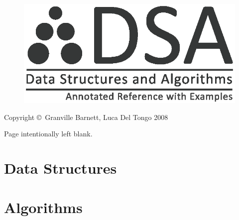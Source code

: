 \documentclass[10pt,oneside,a4paper]{report}
\begin{document}
\begin{figure}
\begin{center}
\includegraphics{dsa_logo}
\end{center}
\end{figure}
\title{}
\author{Granville Barnett\\Luca Del Tongo}
\maketitle

\pagestyle{empty}

\newpage
\begin{center}
Copyright \copyright~Granville Barnett, Luca Del Tongo 2008
\end{center}
\newpage

\pagestyle{plain}

\newpage
\tableofcontents
\newpage

\pagestyle{headings}



\pagestyle{empty}

\newpage
\begin{center}
Page intentionally left blank.
\end{center}
\newpage

\pagestyle{headings}


\part{Data Structures}







\part{Algorithms}






\appendix


\end{document}
